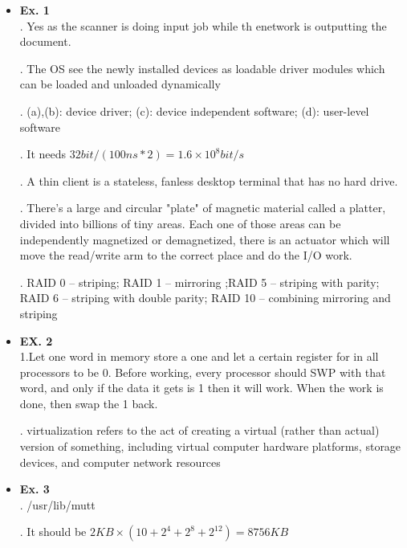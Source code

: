 \documentclass{article}
\begin{document}
\begin{itemize}
\item {\bf Ex. 1}\\
{. Yes as the scanner is doing input job while th enetwork is outputting the document.\\}

{. The OS see the newly installed devices as loadable driver modules which can be loaded and unloaded dynamically\\}

{. (a),(b): device driver; (c): device independent software; (d): user-level software\\}

{. It needs $32bit/(100ns*2) = 1.6\times 10^8bit/s$\\}

{. A thin client is a stateless, fanless desktop terminal that has no hard drive.\\}

{. There's a large and circular "plate" of magnetic material called a platter, divided into billions of tiny areas. Each one of those areas can be independently magnetized or demagnetized, there is an actuator which will move the read/write arm to the correct place and do the I/O work.\\}

{. RAID 0 – striping; RAID 1 – mirroring ;RAID 5 – striping with parity; RAID 6 – striping with double parity; RAID 10 – combining mirroring and striping}
\item {\bf EX. 2}\\
{\noindent 1.Let one word in memory store a one and let a certain register for in all processors to be 0. Before working, every processor should SWP with that word, and only if the data it gets is 1 then it will work. When the work is done, then swap the 1 back.\\}

{.  virtualization refers to the act of creating a virtual (rather than actual) version of something, including virtual computer hardware platforms, storage devices, and computer network resources}



\item {\bf Ex. 3}\\
{. /usr/lib/mutt\\}

{. It should be $2KB\times (10+2^4+2^8+2^12) = 8756KB$}


\end{itemize}
\end{document}
